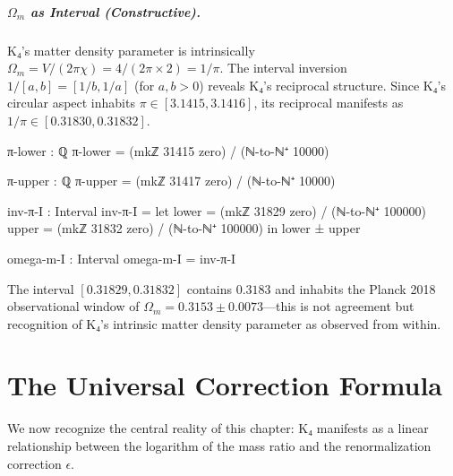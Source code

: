 \documentclass[11pt,a4paper]{book}
\begin{document}
\paragraph{$\Omega_m$ as Interval (Constructive).}
K₄'s matter density parameter is intrinsically $\Omega_m = V / (2\pi\chi) = 4 / (2\pi \times 2) = 1/\pi$.
The interval inversion $1/[a,b] = [1/b, 1/a]$ (for $a,b > 0$) reveals K₄'s reciprocal structure.
Since K₄'s circular aspect inhabits $\pi \in [3.1415, 3.1416]$, its reciprocal manifests as $1/\pi \in [0.31830, 0.31832]$.

\begin{code}
π-lower : ℚ
π-lower = (mkℤ 31415 zero) / (ℕ-to-ℕ⁺ 10000)

π-upper : ℚ
π-upper = (mkℤ 31417 zero) / (ℕ-to-ℕ⁺ 10000)

inv-π-I : Interval
inv-π-I = 
  let lower = (mkℤ 31829 zero) / (ℕ-to-ℕ⁺ 100000)
      upper = (mkℤ 31832 zero) / (ℕ-to-ℕ⁺ 100000)
  in lower ± upper

omega-m-I : Interval
omega-m-I = inv-π-I

\end{code}

The interval $[0.31829, 0.31832]$ contains $0.3183$ and inhabits the Planck 2018 observational window of $\Omega_m = 0.3153 \pm 0.0073$—this is not agreement but recognition of K₄'s intrinsic matter density parameter as observed from within.

\chapter{The Universal Correction Formula}
\label{chap:universal-correction}

We now recognize the central reality of this chapter: K₄ manifests as a linear relationship between the logarithm of the mass ratio and the renormalization correction $\epsilon$.
\end{document}
